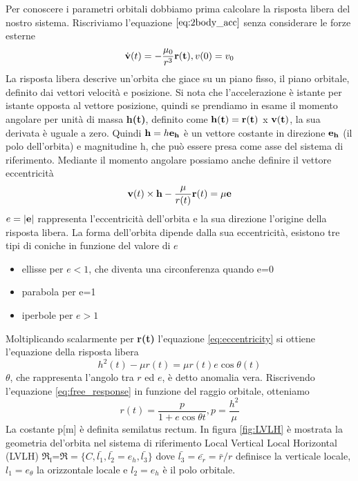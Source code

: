 Per conoscere i parametri orbitali dobbiamo prima calcolare la risposta libera
del nostro sistema. Riscriviamo l'equazione $\ref{eq:2body_acc}$ senza
considerare le forze esterne
\begin{equation}
\dot{\bf v}(t)=-\frac{\mu_0}{r^3}{\bf r(t)}, v(0)=v_0
\end{equation}
La risposta libera descrive un'orbita che giace su un piano fisso, il piano
orbitale, definito dai vettori velocità e posizione. Si nota che l'accelerazione
è istante per istante opposta al vettore posizione, quindi se prendiamo in esame
il momento angolare per unità di massa {\bf h(t)}, definito come ${\bf
h(t)}={\bf r(t)}$ x ${\bf v(t)}$, la sua derivata è uguale a zero. Quindi ${\bf
h}=h{\bf e_h}$ è un vettore costante in direzione ${\bf e_h}$ (il polo dell'orbita) e
magnitudine h, che può essere presa come asse del sistema di riferimento.
Mediante il momento angolare possiamo anche definire il vettore eccentricità
\begin{equation}
{\bf v}(t) \times {\bf h} - \frac{\mu}{r(t)}{\bf r}(t)=\mu{\bf e}
\label{eq:eccentricity}
\end{equation}
$e=|{\bf e}|$ rappresenta  l'eccentricità dell'orbita e la sua direzione
l'origine della risposta libera. La forma dell'orbita dipende dalla sua
eccentricità, esistono tre tipi di coniche in funzione del valore di $e$
\begin{itemize}
  \item ellisse per $e<1$, che diventa una circonferenza quando e=0
  \item parabola per e=1 
  \item iperbole per $e>1$
\end{itemize}
Moltiplicando scalarmente per {\bf r(t)} l'equazione \ref{eq:eccentricity} si ottiene l'equazione
della risposta libera
\begin{equation}
h^2(t)-\mu r(t)=\mu r(t)e \cos{\theta(t)}
\label{eq:free_response}
\end{equation}
$\theta$, che rappresenta l'angolo tra $r$ ed $e$, è detto anomalia vera.
Riscrivendo l'equazione \ref{eq:free_response} in funzione del raggio orbitale,
otteniamo
\begin{equation}
r(t)=\frac{p}{1+e\cos{\theta{t}}} , p=\frac{h^2}{\mu}
\end{equation}
La costante p[m] è definita semilatus rectum. In figura \ref{fig:LVLH} è mostrata la
geometria del'orbita nel sistema di riferimento Local Vertical Local Horizontal (LVLH)
$\mathfrak{R_l}$=$\mathfrak{R}=\{C,\bar{l_1},\bar{l_2}=e_h,\bar{l_3}\}$ dove
$\bar{l_3}=\bar{e_r}=\bar{r}/r$ definisce la verticale locale, $l_1=e_{\theta}$
la orizzontale locale e $l_2=e_h$ è il polo orbitale.

